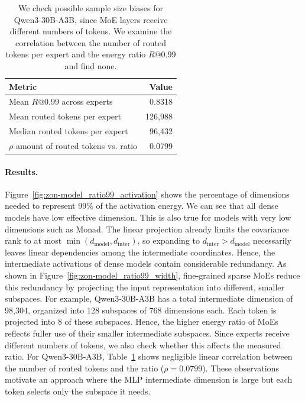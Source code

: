 \begin{table}[!htbp]
    \setlength{\abovecaptionskip}{3pt}
    \caption{We check possible sample size biases for Qwen3-30B-A3B, since
    MoE layers receive different numbers of tokens.
    We examine the correlation between the number of routed tokens
    per expert and the energy ratio $R@0.99$ and find none.}
    \label{tab:zon-moe_bias_checks}
    \centering
    \begin{tabularx}{\linewidth}{@{}Xr@{}}
    \toprule
    Metric & Value \\
    \midrule
    Mean $R@0.99$ across experts & 0.8318 \\
    Mean routed tokens per expert & 126{,}988 \\
    Median routed tokens per expert & 96{,}432 \\
    $\rho$ amount of routed tokens vs. ratio & 0.0799 \\
    \bottomrule
    \end{tabularx}
\end{table}

\paragraph{Results.} Figure~\ref{fig:zon-model_ratio99_activation} shows the percentage of dimensions needed to
represent 99\% of the activation energy. We can see that all dense models
have low effective dimension. This is also true for models with very low dimensions
such as Monad. The linear projection already limits the covariance rank to at most
$\min(d_{\text{model}},d_{\text{inter}})$, so expanding to $d_{\text{inter}}>d_{\text{model}}$
necessarily leaves linear dependencies among the intermediate coordinates.
Hence, the intermediate activations of dense models contain considerable redundancy.
As shown in Figure~\ref{fig:zon-model_ratio99_width}, fine-grained sparse MoEs reduce this redundancy
by projecting the input representation into different, smaller subspaces.
For example, Qwen3-30B-A3B has a total intermediate dimension of 98,304,
organized into 128 subspaces of 768 dimensions each.
Each token is projected into 8 of these subspaces.
Hence, the higher energy ratio of MoEs reflects fuller use of their smaller intermediate subspaces.
Since experts receive different numbers of tokens, we also check whether this affects
the measured ratio. For Qwen3-30B-A3B, Table~\ref{tab:zon-moe_bias_checks} shows negligible
linear correlation between the number of routed tokens and the ratio ($\rho=0.0799$).
These observations motivate an approach where the MLP intermediate dimension
is large but each token selects only the subspace it needs.

